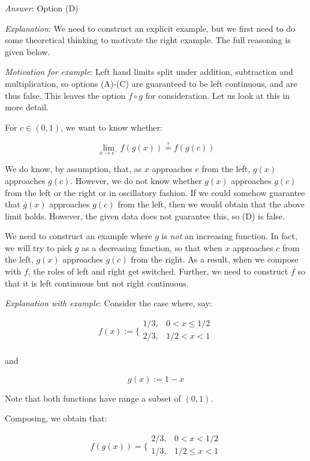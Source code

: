 \documentclass[10pt]{amsart}
\begin{document}
\begin{enumerate}
  {\em Answer}: Option (D)

  {\em Explanation}: We need to construct an explicit example, but we
  first need to do some theoretical thinking to motivate the right
  example. The full reasoning is given below.

  {\em Motivation for example}: Left hand limits split under addition,
  subtraction and multiplication, so options (A)-(C) are guaranteed to
  be left continuous, and are thus false. This leaves the option $f
  \circ g$ for consideration. Let us look at this in more detail.

  For $c \in (0,1)$, we want to know whether:

  $$\lim_{x \to c^-} f(g(x)) \stackrel{?}{=} f(g(c))$$

  We do know, by assumption, that, as $x$ approaches $c$ from the
  left, $g(x)$ approaches $g(c)$. However, we do not know whether
  $g(x)$ approaches $g(c)$ from the left or the right or in
  oscillatory fashion. If we could somehow guarantee that $g(x)$
  approaches $g(c)$ from the left, then we would obtain that the above
  limit holds. However, the given data does not guarantee this, so (D)
  is false.

  We need to construct an example where $g$ is {\em not} an increasing
  function. In fact, we will try to pick $g$ as a decreasing function,
  so that when $x$ approaches $c$ from the left, $g(x)$ approaches
  $g(c)$ from the right. As a result, when we compose with $f$, the
  roles of left and right get switched. Further, we need to construct
  $f$ so that it is left continuous but not right continuous.

  {\em Explanation with example}: Consider the case where, say:

  $$f(x) := \lbrace\begin{array}{rl}1/3,& 0 < x \le 1/2 \\ 2/3, & 1/2 < x < 1 \\\end{array}$$

  and

  $$g(x) := 1 - x$$

  Note that both functions have range a subset of $(0,1)$.

  Composing, we obtain that:

  $$f(g(x)) = \lbrace\begin{array}{rl}2/3,& 0 < x < 1/2\\ 1/3, & 1/2 \le x < 1 \\\end{array}$$


\end{enumerate}
\end{document}
